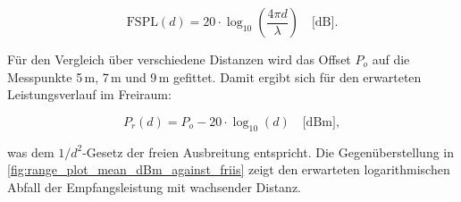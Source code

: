 \begin{equation}
\mathrm{FSPL}(d) = 20 \cdot \log_{10}\!\left(\frac{4\pi d}{\lambda}\right) \quad \text{[dB]}.
\label{eq:fspl_friis}
\end{equation}

Für den Vergleich über verschiedene Distanzen wird das Offset $P_o$ auf die Messpunkte 5\,m, 7\,m und 9\,m gefittet. Damit ergibt sich für den erwarteten Leistungsverlauf im Freiraum:

\begin{equation}
P_r(d) = P_o - 20 \cdot \log_{10}(d) \quad \text{[dBm]},
\label{eq:friis_fit}
\end{equation}

was dem $1/d^2$-Gesetz der freien Ausbreitung entspricht. Die Gegenüberstellung in \autoref{fig:range_plot_mean_dBm_against_friis} zeigt den erwarteten logarithmischen Abfall der Empfangsleistung mit wachsender Distanz.
